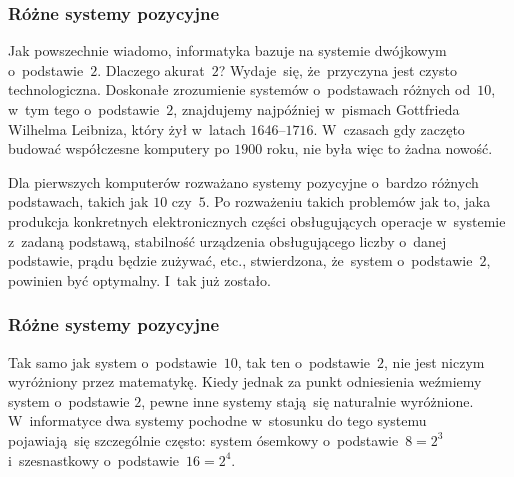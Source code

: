 \documentclass[10pt,t]{beamer}
\begin{document}
\begin{frame}
  \frametitle{Różne systemy pozycyjne}



  Jak powszechnie wiadomo, informatyka bazuje na systemie dwójkowym
  o~podstawie~$2$. Dlaczego akurat~$2$? Wydaje~się, że~przyczyna jest
  czysto technologiczna. Doskonałe zrozumienie systemów o~podstawach
  różnych od~$10$, w~tym tego o~podstawie~$2$, znajdujemy najpóźniej
  w~pismach Gottfrieda Wilhelma Leibniza, który żył w~latach
  $1646\text{--}1716$. W~czasach gdy zaczęto budować współczesne komputery
  po $1900$ roku, nie była więc to żadna nowość.

  Dla pierwszych komputerów rozważano systemy pozycyjne o~bardzo różnych
  podstawach, takich jak $10$ czy~$5$. Po rozważeniu takich problemów jak
  to, jaka produkcja konkretnych elektronicznych części obsługujących
  operacje w~systemie z~zadaną podstawą, stabilność urządzenia
  obsługującego liczby o~danej podstawie, prądu będzie zużywać, etc.,
  stwierdzona, że~system o~podstawie~$2$, powinien być optymalny. I~tak już
  zostało.

\end{frame}





\begin{frame}
  \frametitle{Różne systemy pozycyjne}


  Tak samo jak system o~podstawie~$10$, tak ten o~podstawie~$2$, nie
  jest niczym wyróżniony przez matematykę. Kiedy jednak za punkt odniesienia
  weźmiemy system o~podstawie $2$, pewne inne systemy stają~się
  naturalnie wyróżnione. W~informatyce dwa systemy pochodne w~stosunku do
  tego systemu pojawiają~się szczególnie często: system ósemkowy
  o~podstawie~$8 = 2^{ 3 }$ i~szesnastkowy o~podstawie~$16 = 2^{ 4 }$.

\end{frame}
\end{document}
